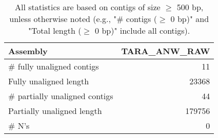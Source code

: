 \documentclass[12pt,a4paper]{article}
\begin{document}
\begin{table}[ht]
\begin{center}
\caption{All statistics are based on contigs of size $\geq$ 500 bp, unless otherwise noted (e.g., "\# contigs ($\geq$ 0 bp)" and "Total length ($\geq$ 0 bp)" include all contigs).}
\begin{tabular}{|l*{1}{|r}|}
\hline
Assembly & TARA\_ANW\_RAW \\ \hline
\# fully unaligned contigs & 11 \\ \hline
Fully unaligned length & 23368 \\ \hline
\# partially unaligned contigs & 44 \\ \hline
Partially unaligned length & 179756 \\ \hline
\# N's & 0 \\ \hline
\end{tabular}
\end{center}
\end{table}
\end{document}
